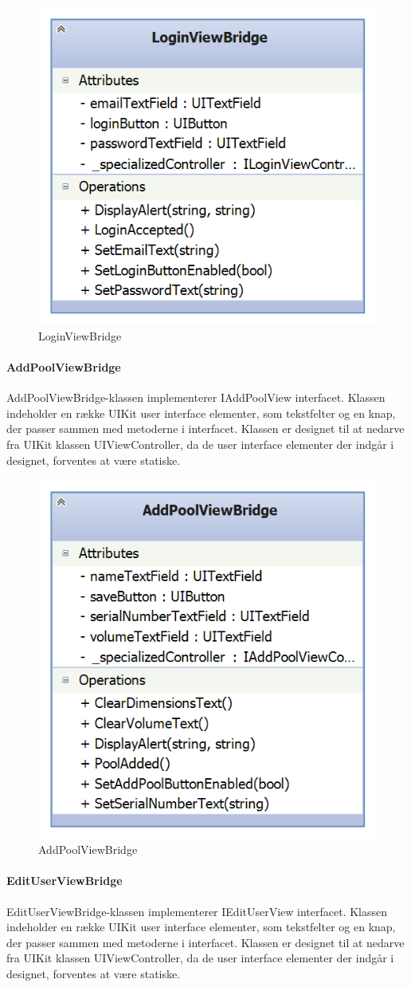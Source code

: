 \begin{figure}
	\centering
	\includegraphics[width=0.3\linewidth]{figs/design/ios_loginviewbridge}
	\caption{LoginViewBridge}
	\label{fig:ios_loginviewbridge}
\end{figure}

\paragraph{AddPoolViewBridge}
AddPoolViewBridge-klassen implementerer IAddPoolView interfacet. Klassen indeholder en række UIKit user interface elementer, som tekstfelter og en knap, der passer sammen med metoderne i interfacet. Klassen er designet til at nedarve fra UIKit klassen UIViewController, da de user interface elementer der indgår i designet, forventes at være statiske.

\begin{figure}
	\centering
	\includegraphics[width=0.3\linewidth]{figs/design/ios_addpoolviewbridge}
	\caption{AddPoolViewBridge}
	\label{fig:ios_addpoolviewbridge}
\end{figure}

\paragraph{EditUserViewBridge}
EditUserViewBridge-klassen implementerer IEditUserView interfacet. Klassen indeholder en række UIKit user interface elementer, som tekstfelter og en knap, der passer sammen med metoderne i interfacet. Klassen er designet til at nedarve fra UIKit klassen UIViewController, da de user interface elementer der indgår i designet, forventes at være statiske.

